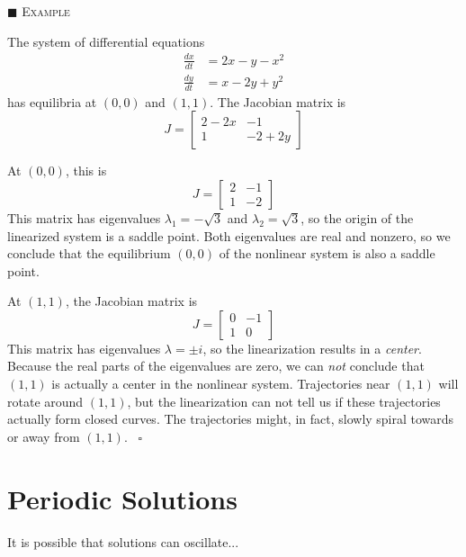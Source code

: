 \documentclass[reqno]{immbook}
\numberwithin{equation}{chapter}
\numberwithin{question}{section}
\numberwithin{theorem}{chapter}
\numberwithin{figure}{chapter}
\theoremstyle{definition}
\newtheorem{exercise}{}[section]
\newenvironment{xexample}%
{%

\medskip\noindent\addtocounter{example}{1}$\blacksquare$ \textsc{Example \theexample}\hspace*{1em}%
}%
{%
~\hfill$\square$

\medskip
}
\newenvironment{exercises}%
{%
\medskip\hrule\medskip\noindent\textbf{Exercises}%
}%
{%
\medskip\hrule
}
\begin{document}
\begin{xexample}
The system of differential equations
\begin{equation}
\begin{split}
  \frac{dx}{dt} & = 2x - y -x^2 \\
  \frac{dy}{dt} & = x - 2y + y^2
\end{split}
\end{equation}
has equilibria at $(0,0)$ and $(1,1)$.
The Jacobian matrix is
\begin{equation}
  J = \begin{bmatrix}
           2-2x & -1 \\
	   1 & -2 + 2y
      \end{bmatrix}
\end{equation}

At $(0,0)$, this is
\begin{equation}
  J = \begin{bmatrix}
           2 & -1 \\
	   1 & -2
      \end{bmatrix}
\end{equation}
This matrix has eigenvalues $\lambda_1 = -\sqrt{3}$ 
and $\lambda_2 = \sqrt{3}$, so the
origin of the  linearized system is a saddle point.
Both eigenvalues are real and nonzero,
so we conclude that the equilibrium
$(0,0)$ of the nonlinear system is also a saddle point.

At $(1,1)$, the Jacobian matrix is
\begin{equation}
  J = \begin{bmatrix}
           0 & -1 \\
	   1 & 0
      \end{bmatrix}
\end{equation}
This matrix has eigenvalues $\lambda=\pm i$,
so the linearization results in a \emph{center}.
Because the real parts of the eigenvalues are
zero, we can \emph{not} conclude that $(1,1)$
is actually a center in the nonlinear system.
Trajectories near $(1,1)$ will rotate around $(1,1)$, but
the linearization can not tell us if these trajectories
actually form closed curves.
The trajectories might, in fact, slowly spiral
towards or away from $(1,1)$.
\end{xexample}
%
\newpage
%
%
\section{Periodic Solutions}
It is possible that solutions can oscillate...
% 
\end{document}
